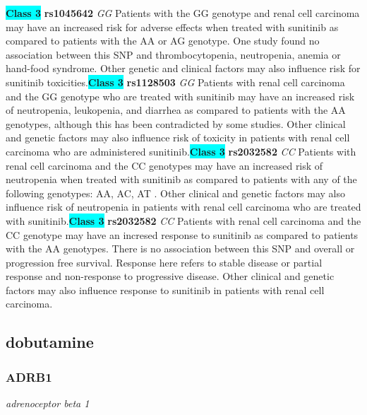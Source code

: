\documentclass{report}
\begin{document}
\textbf{\colorbox{cyan} {Class 3}} \textbf{ rs1045642 } \textit{ GG }
Patients with the GG genotype and renal cell carcinoma may have an increased risk for adverse effects when treated with sunitinib as compared to patients with the AA or AG genotype. One study found no association between this SNP and thrombocytopenia, neutropenia, anemia or hand-food syndrome. Other genetic and clinical factors may also influence risk for sunitinib toxicities.\newline\textbf{\colorbox{cyan} {Class 3}} \textbf{ rs1128503 } \textit{ GG }
Patients with renal cell carcinoma and the GG genotype who are treated with sunitinib may have an increased risk of  neutropenia, leukopenia, and diarrhea as compared to patients with the AA genotypes, although this has been contradicted by some studies. Other clinical and genetic factors may also influence risk of toxicity in patients with renal cell carcinoma who are administered sunitinib.\newline\textbf{\colorbox{cyan} {Class 3}} \textbf{ rs2032582 } \textit{ CC }
Patients with renal cell carcinoma and the CC genotypes may have an increased risk of neutropenia when treated with sunitinib as compared to patients with any of the following genotypes: AA, AC, AT . Other clinical and genetic factors may also influence risk of neutropenia in patients with renal cell carcinoma who are treated with sunitinib.\newline\textbf{\colorbox{cyan} {Class 3}} \textbf{ rs2032582 } \textit{ CC }
Patients with renal cell carcinoma and the CC genotype may have an incresed response to sunitinib as compared to patients with the AA genotypes. There is no association between this SNP and overall or progression free survival.   Response here refers to stable disease or partial response and non-response to progressive disease. Other clinical and genetic factors may also influence response to sunitinib in patients with renal cell carcinoma. \newline\subsection{ dobutamine }\subsubsection{ ADRB1 }
\textit{ adrenoceptor beta 1 }
\end{document}
